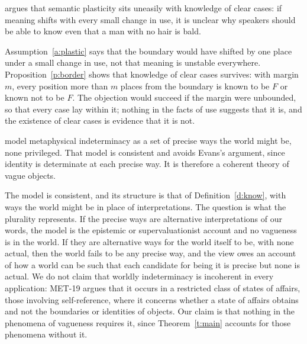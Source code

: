\documentclass{situationist-preprint}
\begin{document}
\begin{objection}[Plasticity]\label{o:plastic}
\citet{Hawthorne2006} argues that semantic plasticity sits uneasily with knowledge of clear cases: if meaning shifts with every small change in use, it is unclear why speakers should be able to know even that a man with no hair is bald.
\end{objection}

\begin{reply}
Assumption~\ref{a:plastic} says that the boundary would have shifted by one place under a small change in use, not that meaning is unstable everywhere. Proposition~\ref{p:border} shows that knowledge of clear cases survives: with margin $m$, every position more than $m$ places from the boundary is known to be $F$ or known not to be $F$. The objection would succeed if the margin were unbounded, so that every case lay within it; nothing in the facts of use suggests that it is, and the existence of clear cases is evidence that it is not.
\end{reply}

\begin{objection}
\citet{BarnesWilliams2011} model metaphysical indeterminacy as a set of precise ways the world might be, none privileged. That model is consistent and avoids Evans's argument, since identity is determinate at each precise way. It is therefore a coherent theory of vague objects.
\end{objection}

\begin{reply}
The model is consistent, and its structure is that of Definition~\ref{d:know}, with ways the world might be in place of interpretations. The question is what the plurality represents. If the precise ways are alternative interpretations of our words, the model is the epistemic or supervaluationist account and no vagueness is in the world. If they are alternative ways for the world itself to be, with none actual, then the world fails to be any precise way, and the view owes an account of how a world can be such that each candidate for being it is precise but none is actual. We do not claim that worldly indeterminacy is incoherent in every application: MET-19 argues that it occurs in a restricted class of states of affairs, those involving self-reference, where it concerns whether a state of affairs obtains and not the boundaries or identities of objects. Our claim is that nothing in the phenomena of vagueness requires it, since Theorem~\ref{t:main} accounts for those phenomena without it.
\end{reply}
\end{document}
